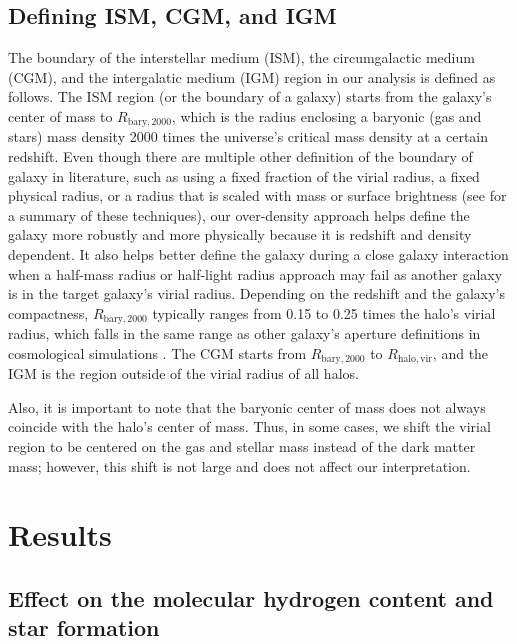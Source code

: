 \documentclass[linenumbers, twocolumn]{aastex631}
\begin{document}
\subsection{Defining ISM, CGM, and IGM}

The boundary of the interstellar medium (ISM), the circumgalactic medium (CGM), and the intergalatic medium (IGM) region in our analysis is defined as follows. The ISM region (or the boundary of a galaxy) starts from the galaxy's center of mass to $R_{\mathrm{bary}, 2000}$, which is the radius enclosing a baryonic (gas and stars) mass density 2000 times the universe's critical mass density at a certain redshift. Even though there are multiple other definition of the boundary of galaxy in literature, such as using a fixed fraction of the virial radius, a fixed physical radius, or a radius that is scaled with mass or surface brightness (see \citealp{Stevens+2014} for a summary of these techniques), our over-density approach helps define the galaxy more robustly and more physically because it is redshift and density dependent. It also helps better define the galaxy during a close galaxy interaction when a half-mass radius or half-light radius approach may fail as another galaxy is in the target galaxy's virial radius. Depending on the redshift and the galaxy's compactness, $R_{\mathrm{bary}, 2000}$ typically ranges from 0.15 to 0.25 times the halo's virial radius, which falls in the same range as other galaxy's aperture definitions in cosmological simulations \citep{Stevens+2014}. The CGM starts from $R_{\mathrm{bary}, 2000}$ to $R_{\mathrm{halo,vir}}$, and the IGM is the region outside of the virial radius of all halos.

Also, it is important to note that the baryonic center of mass does not always coincide with the halo's center of mass. Thus, in some cases, we shift the virial region to be centered on the gas and stellar mass instead of the dark matter mass; however, this shift is not large and does not affect our interpretation.    
 
\section{Results}

\subsection{Effect on the molecular hydrogen content and star formation}
\label{subsect:effect_on_sf}
\end{document}
